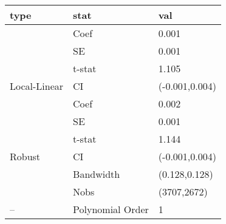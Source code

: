 
\begin{tabular}{lll}
\toprule
type & stat & val\\
\midrule
 & Coef & 0.001\\

 & SE & 0.001\\

 & t-stat & 1.105\\

\multirow{-4}{*}{\raggedright\arraybackslash Local-Linear} & CI & (-0.001,0.004)\\
\cmidrule{1-3}
 & Coef & 0.002\\

 & SE & 0.001\\

 & t-stat & 1.144\\

\multirow{-4}{*}{\raggedright\arraybackslash Robust} & CI & (-0.001,0.004)\\
\cmidrule{1-3}
 & Bandwidth & (0.128,0.128)\\

 & Nobs & (3707,2672)\\

\multirow{-3}{*}{\raggedright\arraybackslash --} & Polynomial Order & 1\\
\bottomrule
\end{tabular}